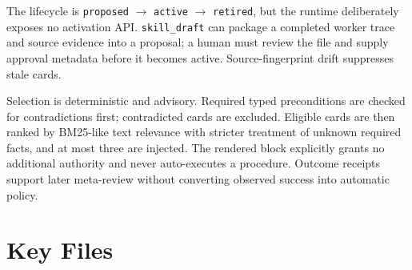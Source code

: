 \documentclass[11pt,letterpaper]{report}
\newcommand{\code}[1]{\texttt{#1}}
\begin{document}
The lifecycle is \code{proposed} $\rightarrow$ \code{active}
$\rightarrow$ \code{retired}, but the runtime deliberately exposes no
activation API. \code{skill\_draft} can package a completed worker trace and
source evidence into a proposal; a human must review the file and supply
approval metadata before it becomes active. Source-fingerprint drift
suppresses stale cards.

Selection is deterministic and advisory. Required typed preconditions are
checked for contradictions first; contradicted cards are excluded. Eligible
cards are then ranked by BM25-like text relevance with stricter treatment of
unknown required facts, and at most three are injected. The rendered block
explicitly grants no additional authority and never auto-executes a procedure.
Outcome receipts support later meta-review without converting observed success
into automatic policy.

\section{Key Files}
\end{document}
